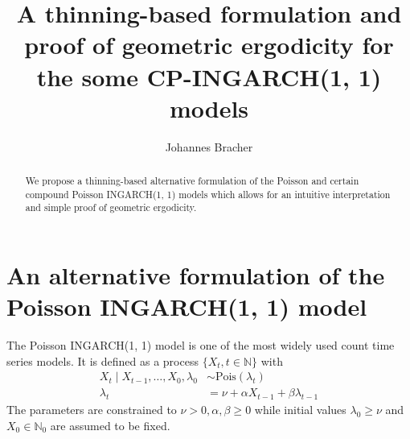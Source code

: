 \documentclass[10pt,a4paper]{article}
\begin{document}
\title{A thinning-based formulation and proof of geometric ergodicity for the some CP-INGARCH(1, 1) models}
\author{Johannes Bracher}

\maketitle

\newcommand{\juv}{J}

\begin{abstract}
We propose a thinning-based alternative formulation of the Poisson and certain compound Poisson INGARCH(1, 1) models which allows for an intuitive interpretation and simple proof of geometric ergodicity.
\end{abstract}

\section{An alternative formulation of the Poisson INGARCH(1, 1) model}
\label{sec:alternative_formulation}

The Poisson INGARCH(1, 1) model \cite{Ferland2006, Fokianos2009} is one of the most widely used count time series models. It is defined as a process $\{X_t, t \in \mathbb{N}\}$ with
\begin{align}
X_t \mid X_{t - 1}, \dots, X_0, \lambda_0 & \sim \text{Pois}(\lambda_t)\label{eq:X_t_original}\\
\lambda_t & = \nu + \alpha X_{t - 1} + \beta \lambda_{t - 1} \label{eq:lambda_t}
\end{align}
The parameters are constrained to $\nu > 0, \alpha, \beta \geq 0$ while initial values $\lambda_0 \geq \nu$ and $X_0 \in \mathbb{N}_0$ are assumed to be fixed.
\end{document}
